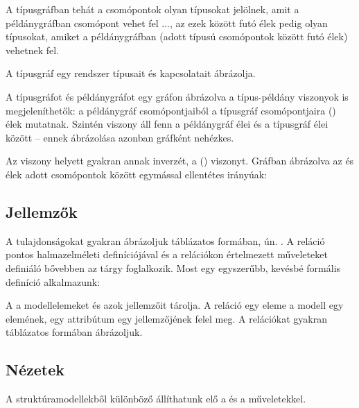 A típusgráfban tehát a csomópontok olyan típusokat jelölnek, amit a példánygráfban csomópont vehet fel ..., az ezek között futó élek pedig olyan típusokat, amiket a példánygráfban (adott típusú csomópontok között futó élek) vehetnek fel. 

A típusgráf egy rendszer  típusait és kapcsolatait ábrázolja.

A típusgráfot és példánygráfot egy gráfon ábrázolva a típus-példány viszonyok is megjeleníthetők: a példánygráf csomópontjaiból a típusgráf csomópontjaira  () élek mutatnak. Szintén  viszony áll fenn a példánygráf élei és a típusgráf élei között -- ennek ábrázolása azonban gráfként nehézkes.

Az  viszony helyett gyakran annak inverzét, a  () viszonyt. Gráfban ábrázolva az  és  élek adott csomópontok között egymással ellentétes irányúak: 



\subsection{Jellemzők}

A tulajdonságokat gyakran ábrázoljuk táblázatos formában, ún. . A reláció pontos halmazelméleti definíciójával és a relációkon értelmezett műveleteket definiáló  bővebben az \adatb tárgy foglalkozik. Most egy egyszerűbb, kevésbé formális definíció alkalmazunk:

\begin{definicio}
A  a modellelemeket és azok jellemzőit tárolja. A reláció egy eleme a modell egy elemének, egy attribútum egy jellemzőjének felel meg. A relációkat gyakran táblázatos formában ábrázoljuk.
\end{definicio}












\subsection{Nézetek}

A struktúramodellekből különböző  állíthatunk elő a  és a  műveletekkel.

